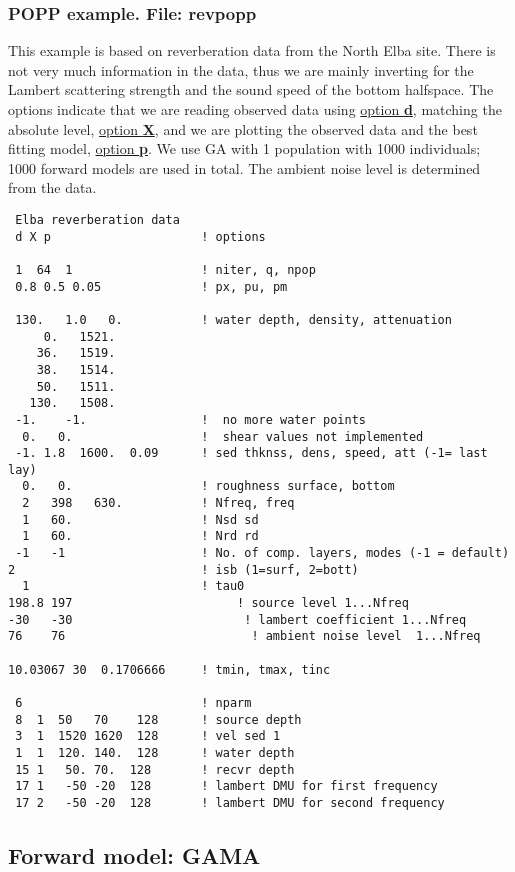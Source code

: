 \documentclass{saclantc}
\begin{document}
\subsubsection{POPP example. File: {\bf revpopp}}
\label{se:revpopp}
This example is based on reverberation data from the North Elba site.
There is not very much information in the data, thus we are mainly 
inverting for the Lambert scattering strength and the sound speed of the
bottom halfspace. 
The options indicate that  we are reading observed data using
 \underline{option {\bf d}}, 
matching the absolute level, \underline{option {\bf X}}, and we are plotting the observed data and the 
best fitting model, \underline{option {\bf p}}. 
We use GA with 1 population with 1000 individuals; 1000 forward models are
used in total.
The ambient noise level is determined from the data.
\small
\begin{verbatim}
 Elba reverberation data
 d X p                     ! options

 1  64  1                  ! niter, q, npop
 0.8 0.5 0.05              ! px, pu, pm

 130.   1.0   0.           ! water depth, density, attenuation
     0.   1521.
    36.   1519.
    38.   1514.
    50.   1511.
   130.   1508.
 -1.    -1.                !  no more water points
  0.   0.                  !  shear values not implemented
 -1. 1.8  1600.  0.09      ! sed thknss, dens, speed, att (-1= last lay)
  0.   0.                  ! roughness surface, bottom
  2   398   630.           ! Nfreq, freq
  1   60.                  ! Nsd sd
  1   60.                  ! Nrd rd
 -1   -1                   ! No. of comp. layers, modes (-1 = default)
2                          ! isb (1=surf, 2=bott)
  1                        ! tau0
198.8 197                       ! source level 1...Nfreq
-30   -30                        ! lambert coefficient 1...Nfreq
76    76                          ! ambient noise level  1...Nfreq

10.03067 30  0.1706666     ! tmin, tmax, tinc

 6                         ! nparm
 8  1  50   70    128      ! source depth
 3  1  1520 1620  128      ! vel sed 1
 1  1  120. 140.  128      ! water depth
 15 1   50. 70.  128       ! recvr depth
 17 1   -50 -20  128       ! lambert DMU for first frequency
 17 2   -50 -20  128       ! lambert DMU for second frequency
\end{verbatim}
\normalsize

\subsection{Forward model: GAMA }
\label{se:gama}
\end{document}
